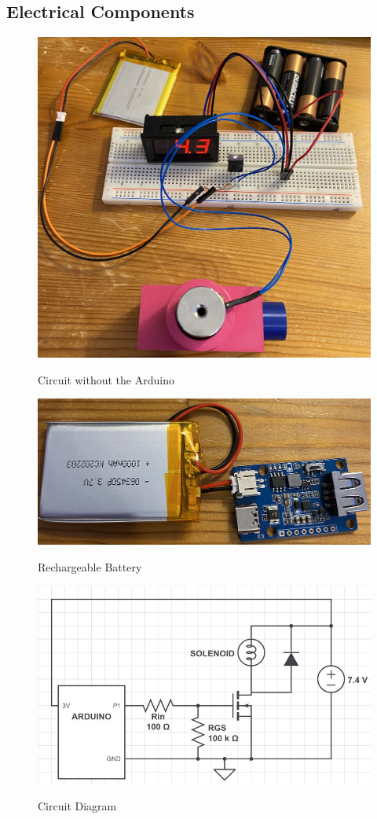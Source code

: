 \documentclass[12pt, titlepage]{article}
\begin{document}
\subsection{Electrical Components}

 \begin{figure}[ht]
 \begin{center}
 {
  \includegraphics[width=0.5\linewidth]{6.png}
 }
 \caption{\label{Circuit} Circuit without the Arduino}
 \end{center}
 \end{figure}
 
  \begin{figure}[ht]
 \begin{center}
 {
  \includegraphics[width=0.5\linewidth]{8.png}
 }
 \caption{\label{Rechargeable Battery} Rechargeable Battery}
 \end{center}
 \end{figure}
 
 
  \begin{figure}[ht]
 \begin{center}
 {
  \includegraphics[width=0.7\linewidth]{10.png}
 }
 \caption{\label{Circuit Diagram} Circuit Diagram}
 \end{center}
 \end{figure}
 
\end{document}

